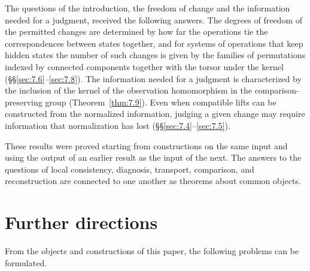 The questions of the introduction, the freedom of change and the information needed for a
judgment, received the following answers.
The degrees of freedom of the permitted changes are determined by how far the operations
tie the correspondences between states together, and for systems of operations that keep
hidden states the number of such changes is given by the families of permutations indexed
by connected components together with the torsor under the kernel (\S\S\ref{sec:7.6}--\ref{sec:7.8}). The information needed for a
judgment is characterized by the inclusion of the kernel of the observation
homomorphism in the comparison-preserving group (Theorem~\ref{thm:7.9}).
Even when compatible lifts can be constructed from the normalized information, judging a
given change may require information that normalization has lost
(\S\S\ref{sec:7.4}--\ref{sec:7.5}).

These results were proved starting from constructions on the same input and using the output
of an earlier result as the input of the next. The answers to the questions of local consistency, diagnosis,
transport, comparison, and reconstruction are connected to one another as theorems about
common objects.

\section*{Further directions}

From the objects and constructions of this paper, the following problems can be formulated.

